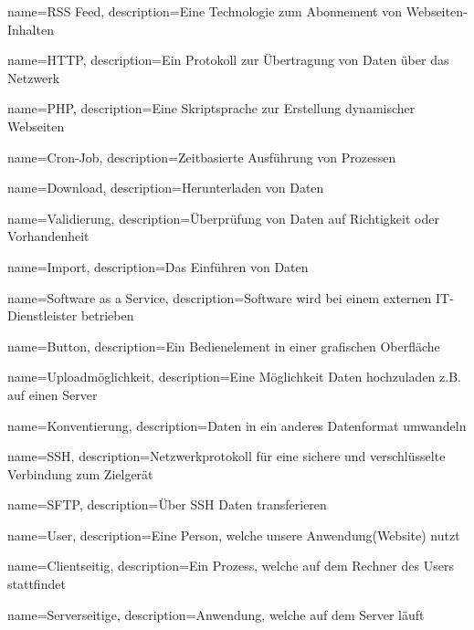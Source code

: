 {
    name=RSS Feed,
    description={Eine Technologie zum Abonnement von Webseiten-Inhalten}
}

{
    name=HTTP,
    description={Ein Protokoll zur Übertragung von Daten über das Netzwerk}
}

{
    name=PHP,
    description={Eine Skriptsprache zur Erstellung dynamischer Webseiten}
}

{
    name=Cron-Job,
    description={Zeitbasierte Ausführung von Prozessen}
}

{
    name=Download,
    description={Herunterladen von Daten}
}

{
    name=Validierung,
    description={Überprüfung von Daten auf Richtigkeit oder Vorhandenheit}
}

{
    name=Import,
    description={Das Einführen von Daten}
}

{
    name=Software as a Service,
    description={Software wird bei einem externen IT-Dienstleister betrieben}
}

{
    name=Button,
    description={Ein Bedienelement in einer grafischen Oberfläche}
}

{
    name=Uploadmöglichkeit,
    description={Eine Möglichkeit Daten hochzuladen z.B. auf einen Server}
}

{
    name=Konventierung,
    description={Daten in ein anderes Datenformat umwandeln}
}

{
    name=SSH,
    description={Netzwerkprotokoll für eine sichere und verschlüsselte Verbindung zum Zielgerät}
}

{
    name=SFTP,
    description={Über SSH Daten transferieren}
}

{
    name=User,
    description={Eine Person, welche unsere Anwendung(Website) nutzt}
}

{
    name=Clientseitig,
    description={Ein Prozess, welche auf dem Rechner des Users stattfindet}
}

{
    name=Serverseitige,
    description={Anwendung, welche auf dem Server läuft}
}